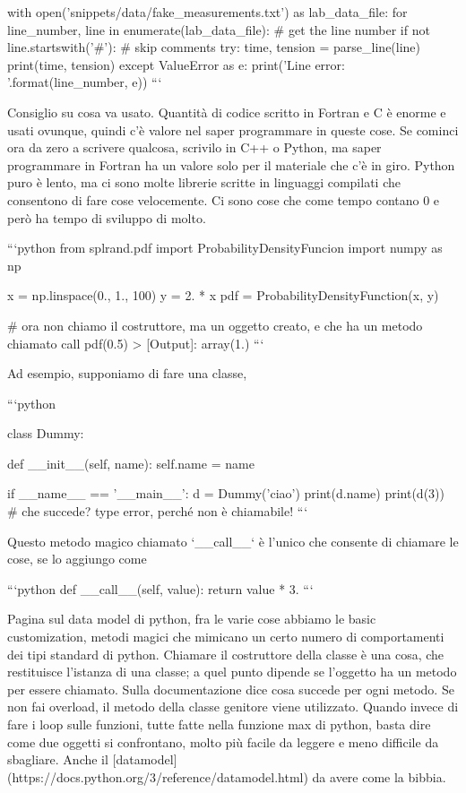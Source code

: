 \documentclass[10pt, a4paper, twosided, titlepage, draft]{book}
\begin{document}
with open(’snippets/data/fake_measurements.txt’) as lab_data_file:
for line_number, line in enumerate(lab_data_file): # get the line number
if not line.startswith(’#’): # skip comments
try:
time, tension = parse_line(line)
print(time, tension)
except ValueError as e:
print(’Line {} error: {}’.format(line_number, e))
```

Consiglio su cosa va usato. Quantità di codice scritto in Fortran e C è enorme e usati ovunque, quindi c'è valore nel saper programmare in queste cose. Se cominci ora da zero a scrivere qualcosa, scrivilo in C++ o Python, ma saper programmare in Fortran ha un valore solo per il materiale che c'è in giro.
Python puro è lento, ma ci sono molte librerie scritte in linguaggi compilati che consentono di fare cose velocemente. Ci sono cose che come tempo contano 0 e però ha tempo di sviluppo di molto.

```python
from splrand.pdf import ProbabilityDensityFuncion
import numpy as np

x = np.linspace(0., 1., 100)
y = 2. * x
pdf = ProbabilityDensityFunction(x, y)

# ora non chiamo il costruttore, ma un oggetto creato, e che ha un metodo chiamato call
pdf(0.5)
> [Output]: array(1.)
```

Ad esempio, supponiamo di fare una classe, 

```python

class Dummy:

def __init__(self, name):
self.name = name

if __name__ == '__main__':
d = Dummy('ciao')
print(d.name)
print(d(3))
# che succede? type error, perché non è chiamabile!
```

Questo metodo magico chiamato `__call__` è l'unico che consente di chiamare le cose, se lo aggiungo come 

```python
def __call__(self, value):
return value * 3.
```

Pagina sul data model di python, fra le varie cose abbiamo le basic customization, metodi magici che mimicano un certo numero di comportamenti dei tipi standard di python.
Chiamare il costruttore della classe è una cosa, che restituisce l'istanza di una classe; a quel punto dipende se l'oggetto ha un metodo per essere chiamato.
Sulla documentazione dice cosa succede per ogni metodo. Se non fai overload, il metodo della classe genitore viene utilizzato.
Quando invece di fare i loop sulle funzioni, tutte fatte nella funzione max di python, basta dire come due oggetti si confrontano, molto più facile da leggere e meno difficile da sbagliare.
Anche il [datamodel](https://docs.python.org/3/reference/datamodel.html) da avere come la bibbia.
\end{document}
